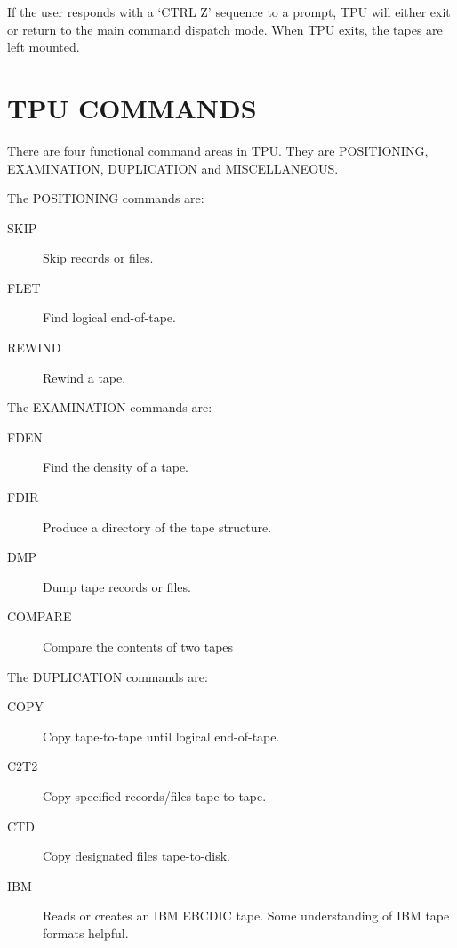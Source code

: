 If the user responds with a `CTRL Z' sequence to a prompt, TPU will either exit
or return to the main command dispatch mode.
When TPU exits, the tapes are left mounted.

\section{TPU COMMANDS}

There are four functional command areas in TPU.
They are POSITIONING, EXAMINATION, DUPLICATION and MISCELLANEOUS.


The POSITIONING commands are:

\begin{description}
\begin{description}
\item [SKIP~~~]	Skip records or files.
\item [FLET~~~]	Find logical end-of-tape.
\item [REWIND~]	Rewind a tape.
\end{description}
\end{description}

The EXAMINATION commands are:

\begin{description}
\begin{description}
\item[FDEN~~~~]	Find the density of a tape.
\item[FDIR~~~~]	Produce a directory of the tape structure.
\item[DMP~~~~~]	Dump tape records or files.
\item[COMPARE~] Compare the contents of two tapes
\end{description}
\end{description}

The DUPLICATION commands are:

\begin{description}
\begin{description}
\item[COPY~~~~]	Copy tape-to-tape until logical end-of-tape.
\item[C2T2~~~~]	Copy specified records/files tape-to-tape.
\item[CTD~~~~~]	Copy designated files tape-to-disk.
\item[IBM~~~~~]	Reads or creates an IBM EBCDIC tape. Some understanding of IBM
tape formats helpful.
\end{description}
\end{description}


